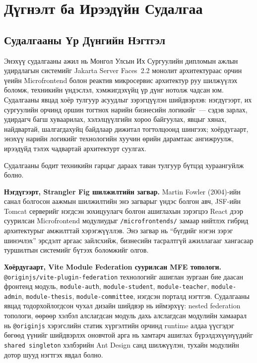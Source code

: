 
\chapter{Дүгнэлт ба Ирээдүйн Судалгаа}

\section{Судалгааны Үр Дүнгийн Нэгтгэл}

Энэхүү судалгааны ажил нь Монгол Улсын Их Сургуулийн дипломын ажлын
удирдлагын системийг Jakarta Server Faces~2.2 монолит архитектураас орчин
үеийн Microfrontend болон реактив микросервис архитектур руу шилжүүлэх
боломж, техникийн үндэслэл, хэмжигдэхүйц үр дүнг нотолж чадсан юм.
Судалгааны явцад хоёр тулгуур асуудлыг зэрэгцүүлэн шийдвэрлэв:
нэгдүгээрт, их сургуулийн орчинд оршин тогтнох нарийн бизнесийн логикийг~---
сэдэв зарлах, удирдагч багш хуваарилах, хэлэлцүүлгийн хороо байгуулах,
явцыг хянах, найдвартай, шалгагдахуйц байдлаар дижитал тогтолцоонд
шингээх; хоёрдугаарт, энэхүү нарийн логикийг технологийн хуучин өрийн
дарамтаас ангижруулж, ирээдүйд тэлэх чадвартай архитектурт суулгах.

Судалгааны бодит техникийн гарцыг дараах таван тулгуур бүтцэд
хураангуйлж болно.

\textbf{Нэгдүгээрт, Strangler Fig шилжилтийн загвар.} Martin Fowler
(2004)-ийн санал болгосон аажмын шилжилтийн энэ загварыг үндэс болгон
авч, JSF-ийн Tomcat серверийг нэгдсэн зохицуулагч болгон ашиглахын
зэрэгцээ React дээр суурилсан Microfrontend модулиудыг
\texttt{/microfrontends/} замаар нийтлэх гибрид архитектурыг амжилттай
хэрэгжүүллэв. Энэ загвар нь ``бүгдийг нэгэн зэрэг шинэчлэх'' эрсдэлт
аргаас зайлсхийж, бизнесийн тасралтгүй ажиллагааг хангасаар туршилтын
системийг бүтээх боломжийг олгов.

\textbf{Хоёрдугаарт, Vite Module Federation суурилсан MFE топологи.}
\texttt{@originjs/vite-plugin-federation} технологийг ашиглан зургаан
бие даасан фронтенд модуль, \texttt{module-auth}, \texttt{module-student},
\texttt{module-teacher}, \texttt{module-admin}, \texttt{module-thesis},
\texttt{module-committee}, нэгдсэн порталд нэгтгэв. Судалгааны явцад
тодорхойлогдсон чухал дизайн шийдвэр нь иймэрхүү: nested federation
топологи, өөрөөр хэлбэл алслагдсан модуль дахь алслагдсан модулийн
хамаарал нь \texttt{@originjs} хэрэгслийн статик хүргэлтийн орчинд runtime
алдаа үүсгэдэг бөгөөд үүнийг шийдвэрлэх оновчтой арга нь хамтарч
ашиглах бүрэлдэхүүнүүдийг \texttt{shared singleton} хэлбэрийн Ant Design
санд шилжүүлэн, тухайн модулийн дотор шууд нэгтгэх явдал болно.

